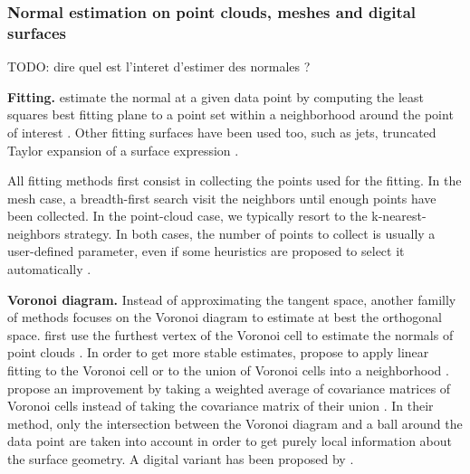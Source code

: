
\subsubsection{Normal estimation on point clouds, meshes and digital surfaces}
\label{sec:estim:all}

TODO: dire quel est l'interet d'estimer des normales ?

\noindent\textbf{Fitting.}
\citeauthor*{Hoppe1992} estimate the normal at a given data point by computing
the least squares best fitting plane to a point set within a neighborhood
around the point of interest \cite{Hoppe1992}.
Other fitting surfaces have been used too, such as jets, \ie truncated Taylor expansion
of a surface expression \cite{Cazals2005,Cazals2008}. 

All fitting methods first consist in collecting the points used for the fitting.
In the mesh case, a breadth-first search visit the neighbors until enough points
have been collected. In the point-cloud case, we typically resort to the k-nearest-neighbors
strategy. In both cases, the number of points to collect is usually a user-defined parameter,
even if some heuristics are proposed to select it automatically \cite{Hoppe1992,Cazals2005}.  



\noindent\textbf{Voronoi diagram.}
Instead of approximating the tangent space, another familly of methods focuses on the
Voronoi diagram to estimate at best the orthogonal space. \citeauthor*{Amenta1999} first use the
furthest vertex of the Voronoi cell to estimate the normals of point clouds \cite{Amenta1999}.
In order to get more stable estimates, \citeauthor*{Alliez2007} propose to apply linear fitting
to the Voronoi cell or to the union of Voronoi cells into a neighborhood \cite{Alliez2007}. 
\citeauthor*{Merigot2011} propose an improvement %
by taking a weighted average of covariance matrices of Voronoi cells instead of
taking the covariance matrix of their union \cite{Merigot2011}. In their method,
only the intersection between the Voronoi diagram and a ball around the data point
are taken into account in order to get purely local information about the surface geometry.
A digital variant has been proposed by \citeauthor*{Cuel2015} \cite{Cuel2015}. 

